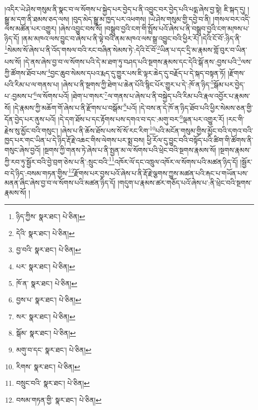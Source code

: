 །འདིར་ཡེ་ཤེས་གསུམ་ནི་སྣང་བ་ལ་སོགས་པ་སྐྱེད་པར་བྱེད་པ་ནི་འབྱུང་བར་བྱེད་པའི་པདྨ་ཞེས་བྱ་སྟེ། ཇི་སྐད་དུ། །སྒྱུ་མ་དག་ནི་ཐམས་ཅད་ལས། །བུད་མེད་སྒྱུ་མ་ཁྱད་པར་འཕགས། །ཡེ་ཤེས་གསུམ་གྱི་དབྱེ་བ་ནི། །གསལ་བར་འདི་ལས་མཚོན་པར་འགྱུར། །ཞེས་འབྱུང་བས་སོ། །བསྒྲུབ་བྱའི་ངག་གི་སྤྲོས་པའོ་ཞེས་པ་ནི་བསྒྲུབ་བྱའི་ངག་མཁས་པ་ཉིད་དོ། །ནམ་མཁའ་ལས་བྱུང་བ་ཞེས་པ་ནི་ལྟེ་བའི་ནམ་མཁའ་ལས་སྒྲ་འབྱུང་བའི་ཕྱིར་རོ། །དེའི་ངོ་བོ་:ཉིད་ནི་\footnote{ཉིད་ཀྱིས་  སྣར་ཐང་།  པེ་ཅིན། }སེམས་སོ་ཞེས་པ་ནི་འོད་གསལ་བའི་རང་བཞིན་སེམས་ཏེ་:དེའི་ངོ་བོ་\footnote{དེའི་  སྣར་ཐང་།  པེ་ཅིན། }ཡིན་པ་དང་དྲི་མ་རྣམས་གློ་བུར་བ་ཡིན་པས་སོ། །དེ་ནས་ཞེས་བྱ་བ་ལ་སོགས་པའི་དེ་མ་ཐག་ཏུ་བཤད་པའི་སྔགས་རྣམས་དང་དེའི་སྒོ་ནས་:བྱས་པའི་\footnote{བྱ་བའི་  སྣར་ཐང་།  པེ་ཅིན། }ལས་ཀྱི་ཚོགས་ཐོབ་པས་\footnote{པར་  སྣར་ཐང་།  པེ་ཅིན། }བྱང་ཆུབ་སེམས་དཔའ་རྨད་དུ་གྱུར་པས་ཇི་ལྟར་ཆེད་དུ་བརྗོད་པ་དེ་སྐད་བསྟན་ཏོ། །རྫོགས་པའི་རིམ་པ་ལ་གནས་པ། །ཞེས་པ་ནི་སྔགས་ཀྱི་ཐེག་པ་ཆེན་པོའི་སྙིང་པོར་གྱུར་པ་དེ་:ཁོ་ན་ཉིད་\footnote{ཁོ་ན་  སྣར་ཐང་།  པེ་ཅིན། }སྒོམ་པར་བྱེད་པ་:བྱམས་པ་\footnote{བྱས་པ་  སྣར་ཐང་།  པེ་ཅིན། }ལ་སོགས་པའོ། །ཐེག་པ་གསར་\footnote{སར་  སྣར་ཐང་།  པེ་ཅིན། }ལ་གནས་པ་ཞེས་པ་ནི་བསྐྱེད་པའི་རིམ་པའི་རྣལ་འབྱོར་པ་རྣམས་སོ། །དེ་རྣམས་ཀྱི་མཆོག་གོ་ཞེས་པ་ནི་རྫོགས་པ་བསྒོམ་\footnote{སྒོམ་  སྣར་ཐང་།  པེ་ཅིན། }པའོ། །དེ་བས་ན་དེ་ཁོ་ན་ཉིད་ཐོབ་པའི་ཕྱིར་སེམས་ཅན་གྱི་དོན་བྱེད་པར་ནུས་པའོ། །དེ་དག་ཐོས་པ་དང་རྟོགས་པས་དགའ་བ་དང་:མགུ་བར་\footnote{མགུ་བ་དང་  སྣར་ཐང་།  པེ་ཅིན། }ལྡན་པར་འགྱུར་རོ། །རང་གི་རྗེས་སུ་མྱོང་བའི་གསུང་། །ཞེས་པ་ནི་ཆོས་ཐོས་པས་སོ་སོ་རང་རིག་\footnote{རིགས་  སྣར་ཐང་།  པེ་ཅིན། }པའི་མངོན་གསུམ་གྱིས་མྱོང་བའི་དགའ་བའི་ཁྱད་པར་གང་ཡིན་པ་དེ་ཉིད་རྡོ་རྗེ་འཆང་གིས་ལེགས་པར་སྨྲ་བས། ཕྱི་རོལ་དུ་བྱུང་བའི་བསྟོད་པའི་ཚིག་གི་ཚོགས་ནི་གསུང་ཞེས་བྱའོ། །སྔགས་ཀྱི་གནས་ཏེ་ཞེས་པ་ནི་སྤྱན་མ་ལ་སོགས་པའི་ཕྲེང་བའི་སྔགས་རྣམས་སོ། །སྔགས་རྣམས་ཀྱི་རབ་ཏུ་སྦྱོར་བའི་བྱེ་བྲག་ཅེས་པ་ནི་:སྲུང་བའི་\footnote{བསྲུང་བའི་  སྣར་ཐང་།  པེ་ཅིན། }འཁོར་ལོ་དང་འཁྲུལ་འཁོར་ལ་སོགས་པའི་མཚན་ཉིད་དོ། །སྦྱོར་བ་དེ་ཉིད་:བསམ་གཏན་གྱིས་\footnote{བསམ་གཏན་གྱི་  སྣར་ཐང་།  པེ་ཅིན། }རྫོགས་པར་བྱས་པའོ་ཞེས་པ་ནི་རྡོ་རྗེ་ལྕགས་ཀྱུས་མཚན་པའི་རྐང་པ་གཡོན་པས་མནན་ཞིང་ཞེས་བྱ་བ་ལ་སོགས་པའི་མཚན་ཉིད་དོ། །གདུག་པ་རྣམས་ཚར་གཅོད་པའོ་ཞེས་པ་:ནི་ཕྲེང་བའི་སྔགས་རྣམས་སོ། །
